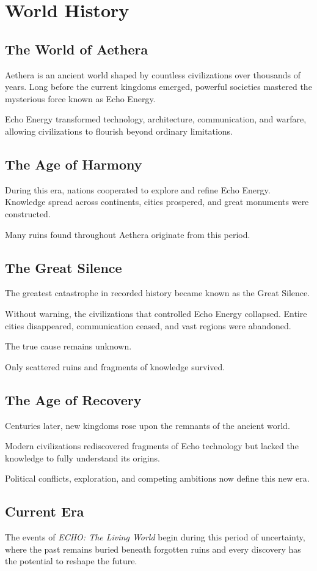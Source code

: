 \chapter{World History}

\section{The World of Aethera}

Aethera is an ancient world shaped by countless civilizations over thousands of years. Long before the current kingdoms emerged, powerful societies mastered the mysterious force known as Echo Energy.

Echo Energy transformed technology, architecture, communication, and warfare, allowing civilizations to flourish beyond ordinary limitations.

\section{The Age of Harmony}

During this era, nations cooperated to explore and refine Echo Energy. Knowledge spread across continents, cities prospered, and great monuments were constructed.

Many ruins found throughout Aethera originate from this period.

\section{The Great Silence}

The greatest catastrophe in recorded history became known as the Great Silence.

Without warning, the civilizations that controlled Echo Energy collapsed. Entire cities disappeared, communication ceased, and vast regions were abandoned.

The true cause remains unknown.

Only scattered ruins and fragments of knowledge survived.

\section{The Age of Recovery}

Centuries later, new kingdoms rose upon the remnants of the ancient world.

Modern civilizations rediscovered fragments of Echo technology but lacked the knowledge to fully understand its origins.

Political conflicts, exploration, and competing ambitions now define this new era.

\section{Current Era}

The events of \textit{ECHO: The Living World} begin during this period of uncertainty, where the past remains buried beneath forgotten ruins and every discovery has the potential to reshape the future.